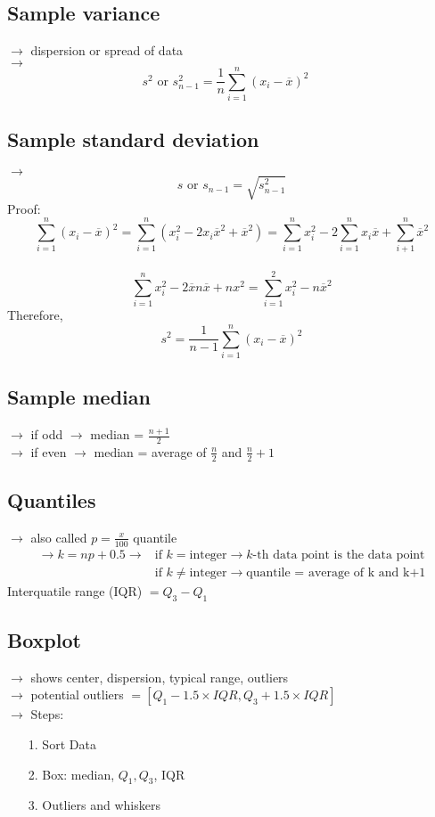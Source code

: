 \documentclass{article}
\begin{document}
\subsection{Sample variance}
$\rightarrow$ dispersion or spread of data\\
$\rightarrow$ \[
s^2 \text{ or } s^2_{n-1} = \frac{1}{n} \sum_{i=1}^n (x_i -\overline{x})^2 \quad \]
\subsection{Sample standard deviation}
$\rightarrow$ \[s \text{ or } s_{n-1} = \sqrt{s^2_{n-1}}\]
Proof: \\
\[\sum_{i=1}^n (x_i - \overline{x})^2 = \sum_{i=1}^n (x^2_i - 2x_i\overline{x}^2 + \overline{x}^2) = \sum_{i=1}^n x^2_i - 2\sum_{i=1}^n x_i\overline{x} + \sum_{i+1}^n \overline{x}^2\]\\
\[\sum_{i=1}^n x^2_i -2\overline{x}n\overline{x} + nx^2 = \sum_{i=1}^2 x^2_i - n\overline{x}^2\]
Therefore, \[s^2 = \frac{1}{n-1} \sum_{i=1}^n (x_i - \overline{x})^2\]
\subsection{Sample median}
$\rightarrow$ if odd $\rightarrow$ median = $\frac{n+1}{2}$ \\
$\rightarrow$ if even $\rightarrow$ median = average of $\frac{n}{2}$ and $\frac{n}{2} +1$ 
\subsection{Quantiles}
$\rightarrow$ also called $p=\frac{x}{100}$ quantile 
\begin{align*}
\rightarrow k = np + 0.5 \rightarrow &\text{if } k = \text{integer} \rightarrow \text{\(k\)-th data point is the data point} \\
&\text{if } k \neq \text{integer} \rightarrow \text{quantile = average of k and k+1}
\end{align*}
Interquatile range (IQR) $ = Q_3 - Q_1$ 
\subsection{Boxplot}
$\rightarrow$ shows center, dispersion, typical range, outliers\\
$\rightarrow$ potential outliers $=[Q_1 - 1.5\times IQR , Q_3 + 1.5\times IQR]$ \\
$\rightarrow$ Steps:
\begin{itemize}
\item[1.]Sort Data
\item[2.]Box: median, $Q_1, Q_3$, IQR
\item[3.] Outliers and whiskers
\end{itemize}
\end{document}
